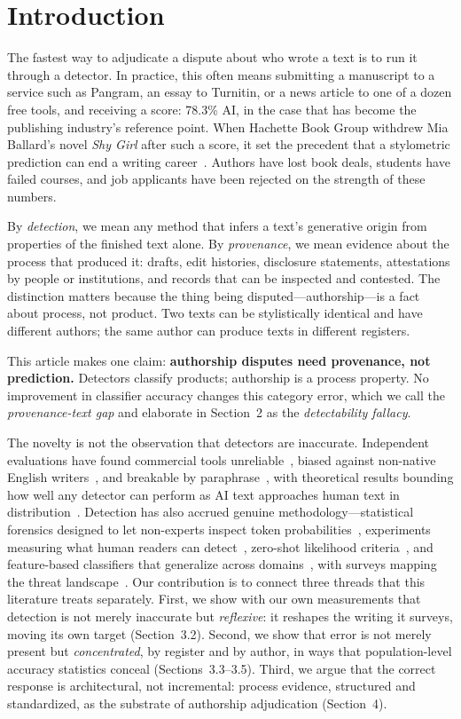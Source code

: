 \documentclass[sigconf,nonacm]{acmart}
\begin{document}
\section{Introduction}

The fastest way to adjudicate a dispute about who wrote a text is to run it through a detector. In practice, this often means submitting a manuscript to a service such as Pangram, an essay to Turnitin, or a news article to one of a dozen free tools, and receiving a score: 78.3\% AI, in the case that has become the publishing industry's reference point. When Hachette Book Group withdrew Mia Ballard's novel \emph{Shy Girl} after such a score, it set the precedent that a stylometric prediction can end a writing career~\cite{r1}. Authors have lost book deals, students have failed courses, and job applicants have been rejected on the strength of these numbers.

By \emph{detection}, we mean any method that infers a text's generative origin from properties of the finished text alone. By \emph{provenance}, we mean evidence about the process that produced it: drafts, edit histories, disclosure statements, attestations by people or institutions, and records that can be inspected and contested. The distinction matters because the thing being disputed---authorship---is a fact about process, not product. Two texts can be stylistically identical and have different authors; the same author can produce texts in different registers.

This article makes one claim: \textbf{authorship disputes need provenance, not prediction.} Detectors classify products; authorship is a process property. No improvement in classifier accuracy changes this category error, which we call the \emph{provenance-text gap} and elaborate in Section~2 as the \emph{detectability fallacy}.

The novelty is not the observation that detectors are inaccurate. Independent evaluations have found commercial tools unreliable~\cite{r4}, biased against non-native English writers~\cite{r3}, and breakable by paraphrase~\cite{r5,r17}, with theoretical results bounding how well any detector can perform as AI text approaches human text in distribution~\cite{r5}. Detection has also accrued genuine methodology---statistical forensics designed to let non-experts inspect token probabilities~\cite{r11}, experiments measuring what human readers can detect~\cite{r12}, zero-shot likelihood criteria~\cite{r13}, and feature-based classifiers that generalize across domains~\cite{r14}, with surveys mapping the threat landscape~\cite{r15}. Our contribution is to connect three threads that this literature treats separately. First, we show with our own measurements that detection is not merely inaccurate but \emph{reflexive}: it reshapes the writing it surveys, moving its own target (Section~3.2). Second, we show that error is not merely present but \emph{concentrated}, by register and by author, in ways that population-level accuracy statistics conceal (Sections~3.3--3.5). Third, we argue that the correct response is architectural, not incremental: process evidence, structured and standardized, as the substrate of authorship adjudication (Section~4).
\end{document}
